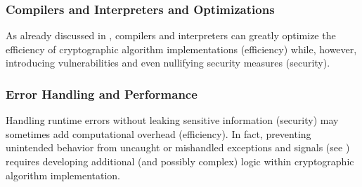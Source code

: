 \subsubsection{Compilers and Interpreters and Optimizations}\label{sec:security_of_cryptographic_algorithms:trade_offs:compilers_and_interpreters_and_optimizations}

As already discussed in , compilers and interpreters can greatly optimize the efficiency of cryptographic algorithm implementations (efficiency) while, however, introducing vulnerabilities and even nullifying security measures \cite{schneider_breaking_2024} (security).


\subsubsection{Error Handling and Performance}\label{sec:security_of_cryptographic_algorithms:trade_offs:error_handling_and_performance}

Handling runtime errors without leaking sensitive information (security) may sometimes add computational overhead (efficiency). In fact, preventing unintended behavior from uncaught or mishandled exceptions and signals (see ) requires developing additional (and possibly complex) logic within cryptographic algorithm implementation.








\vspace{-1.5mm}
\newpage


